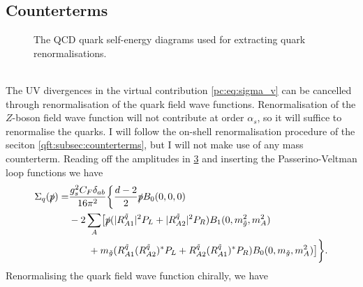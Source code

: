 \documentclass[../main.tex]{subfiles}
\begin{document}
\subsection{Counterterms}
\begin{figure}[ht!]
  \centering
  \begin{subfigure}{.49\textwidth}
    \centering
    \caption{}
    \label{pc:subfig:quarkSE_gluon}
  \end{subfigure}
  \begin{subfigure}{.49\textwidth}
    \centering
    \caption{}
    \label{pc:subfig:quarkSE_gluino}
  \end{subfigure}
  \caption{The QCD quark self-energy diagrams used for extracting quark renormalisations.}
  \label{pc:fig:quarkSE}
\end{figure}
\\
The UV divergences in the virtual contribution \cref{pc:eq:sigma_v} can be cancelled through renormalisation of the quark field wave functions.
Renormalisation of the \(Z\)-boson field wave function will not contribute at order \(\alpha_s\), so it will suffice to renormalise the quarks.
I will follow the on-shell renormalisation procedure of the seciton \cref{qft:subsec:counterterms}, but I will not make use of any mass counterterm.
Reading off the amplitudes in \cref{pc:fig:quarkSE} and inserting the Passerino-Veltman loop functions we have
\begin{align}
  \label{pc:eq:quarkSE}
  \nonumber
  \Sigma_q(\slashed{p}) = & \frac{g_s^2 C_F \delta_{ab}}{16\pi^2} \biggl\{
  \frac{d-2}{2} \slashed{p} B_0(0,0,0)                                                                                                                                                \\
  \nonumber
                          & - 2\sum_A \bigl[
  \slashed{p} (|R^{\tilde{q}}_{A1}|^2P_L + |R^{\tilde{q}}_{A2}|^2P_R)B_1(0,m_{\tilde{g}}^2,m_A^2)                                                                                     \\
                          & \qquad + m_{\tilde{g}} (R^{\tilde{q}}_{A1} (R^{\tilde{q}}_{A2})^\ast P_L + R^{\tilde{q}}_{A2} (R^{\tilde{q}}_{A1})^\ast P_R) B_0(0, m_{\tilde{g}}, m_A^2)
  \bigr]\biggr\}.
\end{align}
Renormalising the quark field wave function chirally, we have
\end{document}
